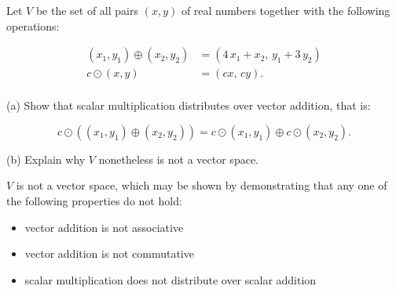 
\begin{exerciseStatement}


 Let \(V\) be the set of all pairs \((x,y)\) of real numbers together with the following operations: 


\begin{align*} (x_1,y_1)\oplus (x_2,y_2)&= \left(4 \, x_{1} + x_{2},\,y_{1} + 3 \, y_{2}\right)  \\c \odot (x,y) &= \left(c x,\,c y\right) . \\ \end{align*}
            

 (a) Show that scalar multiplication distributes over vector addition, that is: 

\[c\odot \left((x_1,y_1)\oplus(x_2,y_2)\right)=c\odot(x_1,y_1)\oplus c\odot(x_2,y_2).
    \]

 (b) Explain why \(V\) nonetheless is not a vector space. 


\end{exerciseStatement}
    
\begin{exerciseAnswer} 


\(V\) is not a vector space, which may be shown by demonstrating that any one of the following properties do not hold: 


\begin{itemize}
\item vector addition is not associative
\item vector addition is not commutative
\item scalar multiplication does not distribute over scalar addition
\end{itemize}
    
\end{exerciseAnswer}
    
